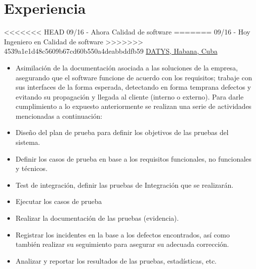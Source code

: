 \documentclass[letterpaper]{twentysecondcves} %
\begin{document}
\makeprofile %
 

\section{Experiencia}

\begin{twenty} %
\twentyitem
<<<<<<< HEAD
    	{09/16 - }
		{Ahora}
        {Calidad de software}
=======
    	{09/16 - Hoy}
		{}
        {Ingeniero en Calidad de software}
>>>>>>> 4539a1e1d48c5609b67cd60b550a4deabbddfb59
        {\href{http://datys.cu/}{DATYS, Habana, Cuba}}
        {}
        {
        {\begin{itemize}
        \item Asimilación de la documentación asociada a las soluciones de la empresa, asegurando que el software  funcione de acuerdo con los requisitos; trabaje con sus interfaces de la forma esperada, detectando en forma temprana defectos y evitando su propagación y llegada al cliente (interno o externo). Para darle cumplimiento a lo expuesto anteriormente se realizan una serie de actividades mencionadas a continuación:
\item Diseño del plan de prueba para definir los objetivos de las pruebas del sistema.
\item Definir los casos de prueba en base a los requisitos funcionales, no funcionales y técnicos.
\item Test de integración, definir las pruebas de Integración que se realizarán.
\item Ejecutar los casos de prueba
\item Realizar la documentación de las pruebas (evidencia).
\item Registrar los incidentes en la base a los defectos encontrados, así como también realizar su seguimiento para asegurar su adecuada corrección.
\item Analizar y reportar los resultados de las pruebas, estadísticas, etc. 
        \end{itemize}}
        }
        
\end{twenty}

\end{document}
